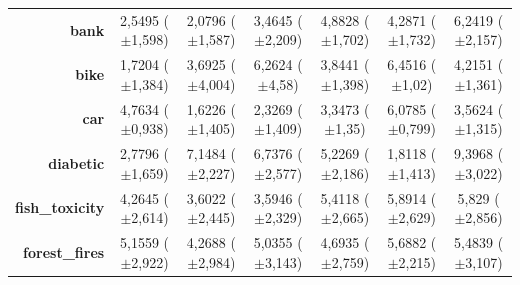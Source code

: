 \documentclass[preprint,review,12pt]{elsarticle}
\begin{document}
\begin{table}[!tb]
{\begin{tabular}{r|ccc|c|c|c|}
			\textbf{bank}                 & \cellcolor[rgb]{ .455,  .765,  .486}2,5495 ($\pm$1,598)                            & \cellcolor[rgb]{ .388,  .745,  .482}2,0796 ($\pm$1,587) & \cellcolor[rgb]{ .588,  .8,  .49}3,4645 ($\pm$2,209)    & \cellcolor[rgb]{ .8,  .863,  .506}4,8828 ($\pm$1,702)   & \cellcolor[rgb]{ .71,  .835,  .498}4,2871 ($\pm$1,732)  & \cellcolor[rgb]{ 1,  .922,  .518}6,2419 ($\pm$2,157)    \\
			\textbf{bike}                 & \cellcolor[rgb]{ .388,  .745,  .482}1,7204 ($\pm$1,384)                            & \cellcolor[rgb]{ .643,  .816,  .494}3,6925 ($\pm$4,004) & \cellcolor[rgb]{ .973,  .914,  .514}6,2624 ($\pm$4,58)  & \cellcolor[rgb]{ .663,  .824,  .498}3,8441 ($\pm$1,398) & \cellcolor[rgb]{ 1,  .922,  .518}6,4516 ($\pm$1,02)     & \cellcolor[rgb]{ .71,  .835,  .498}4,2151 ($\pm$1,361)  \\
			\textbf{car}                  & \cellcolor[rgb]{ .702,  .835,  .498}4,7634 ($\pm$0,938)                            & \cellcolor[rgb]{ .388,  .745,  .482}1,6226 ($\pm$1,405) & \cellcolor[rgb]{ .455,  .765,  .486}2,3269 ($\pm$1,409) & \cellcolor[rgb]{ .561,  .792,  .49}3,3473 ($\pm$1,35)   & \cellcolor[rgb]{ .831,  .871,  .506}6,0785 ($\pm$0,799) & \cellcolor[rgb]{ .58,  .8,  .49}3,5624 ($\pm$1,315)     \\
			\textbf{diabetic}             & \cellcolor[rgb]{ .506,  .776,  .486}2,7796 ($\pm$1,659)                            & \cellcolor[rgb]{ 1,  .886,  .514}7,1484 ($\pm$2,227)    & \cellcolor[rgb]{ 1,  .922,  .518}6,7376 ($\pm$2,577)    & \cellcolor[rgb]{ .812,  .867,  .506}5,2269 ($\pm$2,186) & \cellcolor[rgb]{ .388,  .745,  .482}1,8118 ($\pm$1,413) & \cellcolor[rgb]{ .988,  .69,  .475}9,3968 ($\pm$3,022)  \\
			\textbf{fish\_toxicity}       & \cellcolor[rgb]{ .533,  .784,  .49}4,2645 ($\pm$2,614)                             & \cellcolor[rgb]{ .388,  .745,  .482}3,6022 ($\pm$2,445) & \cellcolor[rgb]{ .388,  .745,  .482}3,5946 ($\pm$2,329) & \cellcolor[rgb]{ .784,  .859,  .502}5,4118 ($\pm$2,665) & \cellcolor[rgb]{ .89,  .89,  .51}5,8914 ($\pm$2,629)    & \cellcolor[rgb]{ .875,  .886,  .51}5,829 ($\pm$2,856)   \\
			\textbf{forest\_fires}        & \cellcolor[rgb]{ .769,  .855,  .502}5,1559 ($\pm$2,922)                            & \cellcolor[rgb]{ .388,  .745,  .482}4,2688 ($\pm$2,984) & \cellcolor[rgb]{ .718,  .839,  .498}5,0355 ($\pm$3,143) & \cellcolor[rgb]{ .569,  .796,  .49}4,6935 ($\pm$2,759)  & \cellcolor[rgb]{ 1,  .922,  .518}5,6882 ($\pm$2,215)    & \cellcolor[rgb]{ .91,  .894,  .51}5,4839 ($\pm$3,107)   \\

\end{tabular}}
\end{table}
\end{document}
